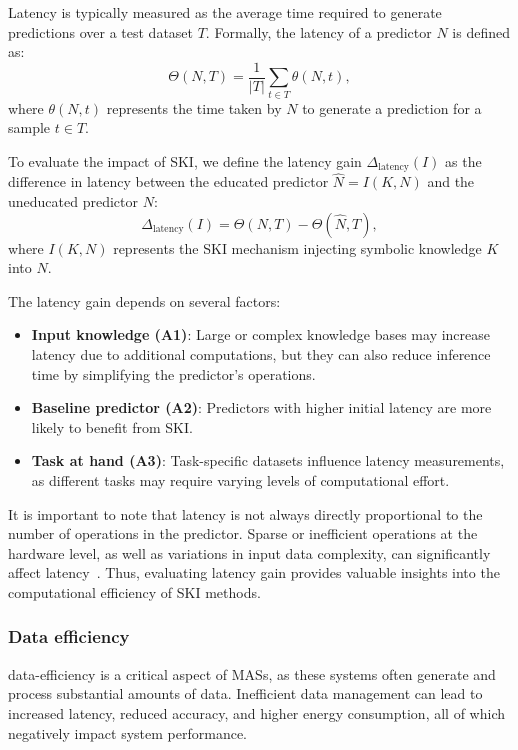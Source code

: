 %
Latency is typically measured as the average time required to generate predictions over a test dataset \(T\).
%
Formally, the latency of a predictor \(N\) is defined as:
%
\begin{equation}
    \label{eq:latency}
    \Theta(N, T) = \frac{1}{|T|} \sum_{t \in T} \theta(N, t),
\end{equation}
%
where \(\theta(N, t)\) represents the time taken by \(N\) to generate a prediction for a sample \(t \in T\).

%
To evaluate the impact of \gls{SKI}, we define the latency gain \(\Delta_{\text{latency}}(I)\) as the difference in latency between the educated predictor \(\hat{N} = I(K, N)\) and the uneducated predictor \(N\):
%
\begin{equation}
    \label{eq:latency-gain}
    \Delta_{\text{latency}}(I) = \Theta(N, T) - \Theta(\hat{N}, T),
\end{equation}
%
where \(I(K, N)\) represents the \gls{SKI} mechanism injecting symbolic knowledge \(K\) into \(N\).

%
The latency gain depends on several factors:
%
\begin{itemize}
    \item \textbf{Input knowledge (\gls{A1})}: Large or complex knowledge bases may increase latency due to additional computations, but they can also reduce inference time by simplifying the predictor's operations.
    \item \textbf{Baseline predictor (\gls{A2})}: Predictors with higher initial latency are more likely to benefit from \gls{SKI}.
    \item \textbf{Task at hand (\gls{A3})}: Task-specific datasets influence latency measurements, as different tasks may require varying levels of computational effort.
\end{itemize}

%
It is important to note that latency is not always directly proportional to the number of operations in the predictor.
%
Sparse or inefficient operations at the hardware level, as well as variations in input data complexity, can significantly affect latency~\cite{CITATION}.
%
Thus, evaluating latency gain provides valuable insights into the computational efficiency of \gls{SKI} methods.


\subsubsection{Data efficiency}\label{subsubsec:ski-meets-intelligent-agents-data-efficiency}
%
\Gls{data-efficiency} is a critical aspect of \glspl{MAS}, as these systems often generate and process substantial amounts of data.
%
Inefficient data management can lead to increased latency, reduced accuracy, and higher energy consumption, all of which negatively impact system performance.

